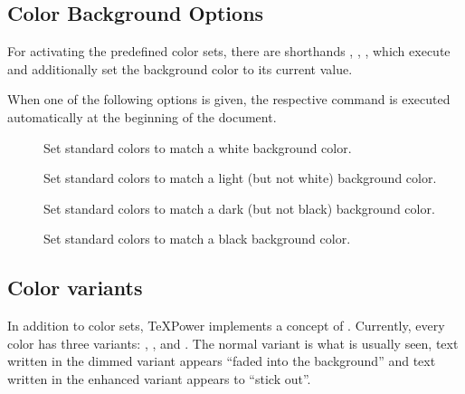 \documentclass[12pt]{scrartcl}
\let\newslide=\relax
\begin{document}
  \newslide

  \subsection{Color Background Options}\label{Sec:ColBgdOpt}
  For activating the predefined color sets, there are shorthands
  ,
  ,
  ,
   which execute
   and additionally set the background color to its current value.

  \newslide

  When one of the following options is given, the respective command is executed automatically at the beginning of the
  document.
  \begin{description}
  \item[]
    Set standard colors to match a white background color.

  \item[]
    Set standard colors to match a light (but not white) background color.

  \item[]
    Set standard colors to match a dark (but not black) background color.

  \item[]
    Set standard colors to match a black background color.
  \end{description}

  \newslide

  \subsection{Color variants}\label{Sec:ColorVariants}
  In addition to color sets, \TeX Power implements a concept of . Currently, every color has three
  variants: , , and . The normal variant is what is usually seen, text
  written in the dimmed variant appears ``faded into the background'' and text written in the enhanced variant appears
  to ``stick out''.
\end{document}
